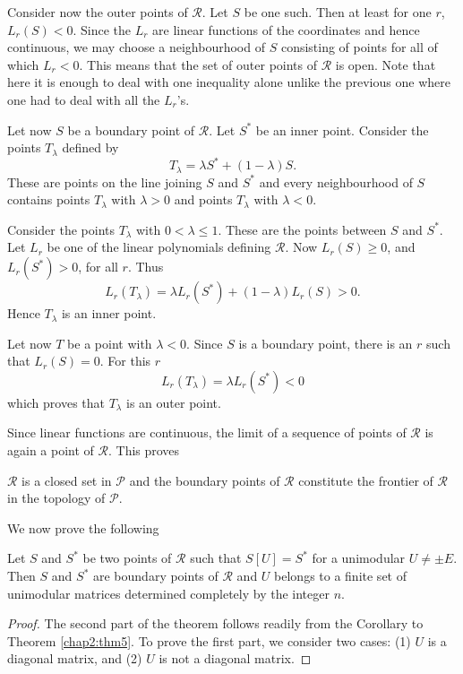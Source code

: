 Consider now the outer points of $\mathscr{R}$. Let $S$ be one
such. Then at least for one $r$, $L_{r}(S)<0$. Since the $L_{r}$ are
linear functions of the coordinates and hence continuous, we may
choose a neighbourhood of $S$ consisting of points for all of which
$L_{r}<0$. This means that the set of outer points of $\mathscr{R}$ is
open. Note that here it is enough to deal with one inequality alone
unlike the previous one where one had to deal with all the $L_{r}$'s.

Let now $S$ be a boundary point of $\mathscr{R}$. Let $S^{\ast}$ be an
inner point. Consider the points $T_{\lambda}$ defined by
$$
T_{\lambda}=\lambda S^{\ast}+(1-\lambda)S.
$$
These are points on the line joining $S$ and $S^{\ast}$ and every
neighbourhood of $S$ contains points $T_{\lambda}$ with $\lambda>0$
and points $T_{\lambda}$ with $\lambda<0$.

Consider the points $T_{\lambda}$ with $0<\lambda\leq 1$. These are
the points between $S$ and $S^{\ast}$. Let $L_{r}$ be one of the
linear polynomials defining $\mathscr{R}$. Now $L_{r}(S)\geq 0$, and
$L_{r}(S^{\ast})>0$, for all $r$. Thus 
$$
L_{r}(T_{\lambda})=\lambda L_{r}(S^{\ast})+(1-\lambda)L_{r}(S)>0.
$$\pageoriginale
Hence $T_{\lambda}$ is an inner point.

Let now $T$ be a point with $\lambda<0$. Since $S$ is a boundary
point, there is an $r$ such that $L_{r}(S)=0$. For this $r$
$$
L_{r}(T_{\lambda})=\lambda L_{r}(S^{\ast})<0
$$
which proves that $T_{\lambda}$ is an outer point.

Since linear functions are continuous, the limit of a sequence of
points of $\mathscr{R}$ is again a point of $\mathscr{R}$. This proves 

\begin{thm}\label{chap2:thm7}
$\mathscr{R}$ is a closed set in $\mathscr{P}$ and the boundary points
  of $\mathscr{R}$ constitute the frontier of $\mathscr{R}$ in the
  topology of $\mathscr{P}$.
\end{thm}

We now prove the following

\begin{thm}\label{chap2:thm8}
Let $S$ and $S^{\ast}$ be two points of $\mathscr{R}$ such that
$S[U]=S^{\ast}$ for a unimodular $U\neq \pm E$. Then $S$ and
$S^{\ast}$ are boundary points of $\mathscr{R}$ and $U$ belongs to a
finite set of unimodular matrices determined completely by the integer $n$.
\end{thm}

\begin{proof}
The second part of the theorem follows readily from the Corollary to
Theorem \ref{chap2:thm5}. To prove the first part, we consider two cases:
(1) $U$ is a diagonal matrix, and (2) $U$ is not a diagonal matrix.
\end{proof}

